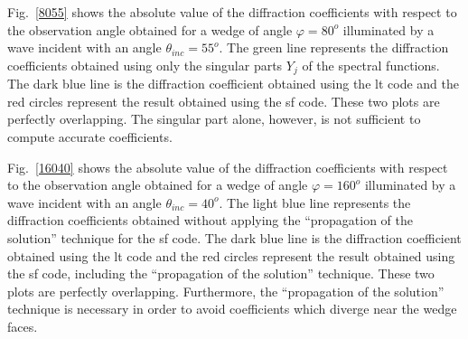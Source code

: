 Fig.~\ref{8055} shows the absolute value of the diffraction coefficients  with respect to the observation angle obtained for a wedge of angle $\varphi=80^o$ illuminated by a wave incident with an angle $\theta_{inc}=55^o$. The green line represents the diffraction coefficients obtained using only the singular parts $Y_j$ of the spectral functions. The dark blue line is the diffraction coefficient obtained using the \acrshort{lt} code and the red circles represent the result obtained using the \acrshort{sf} code. These two plots are perfectly overlapping. The singular part alone, however, is not sufficient to compute accurate coefficients. 

Fig.~\ref{16040} shows the absolute value of the diffraction coefficients with respect to the observation angle obtained for a wedge of angle $\varphi=160^o$ illuminated by a wave incident with an angle $\theta_{inc}=40^o$. The light blue line represents the diffraction coefficients obtained without applying the ``propagation of the solution'' technique for the \acrshort{sf} code. The dark blue line is the diffraction coefficient obtained using the \acrshort{lt} code and the red circles represent the result obtained using the \acrshort{sf} code, including the ``propagation of the solution'' technique. These two plots are perfectly overlapping. Furthermore, the ``propagation of the solution'' technique is necessary in order to avoid coefficients which diverge near the wedge faces. 

